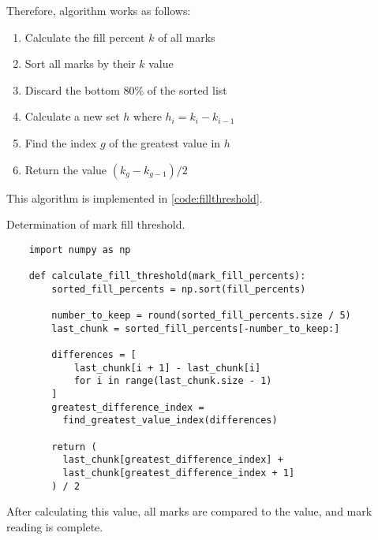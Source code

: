 \documentclass[12pt, letterpaper]{report}
\newcommand*{\itemref}[1]{\hyperref[{#1}]{\autoref*{#1}}}
\begin{document}
Therefore, algorithm works as follows:
\begin{enumerate}
  \item Calculate the fill percent $k$ of all marks
  \item Sort all marks by their $k$ value
  \item Discard the bottom 80\% of the sorted list
  \item Calculate a new set $h$ where $h_i = k_i - k_{i-1}$
  \item Find the index $g$ of the greatest value in $h$
  \item Return the value $(k_g-k_{g-1})/2$
\end{enumerate}

This algorithm is implemented in \itemref{code:fillthreshold}.

\begin{codesample}[!htbp]
  \caption{Determination of mark fill threshold.}
  \label{code:fillthreshold}
  \begin{verbatim}
    import numpy as np

    def calculate_fill_threshold(mark_fill_percents):
        sorted_fill_percents = np.sort(fill_percents)

        number_to_keep = round(sorted_fill_percents.size / 5)
        last_chunk = sorted_fill_percents[-number_to_keep:]

        differences = [
            last_chunk[i + 1] - last_chunk[i]
            for i in range(last_chunk.size - 1)
        ]
        greatest_difference_index =
          find_greatest_value_index(differences)

        return (
          last_chunk[greatest_difference_index] +
          last_chunk[greatest_difference_index + 1]
        ) / 2
  \end{verbatim}
\end{codesample}

After calculating this value, all marks are compared to the value, and mark
reading is complete.
\end{document}
